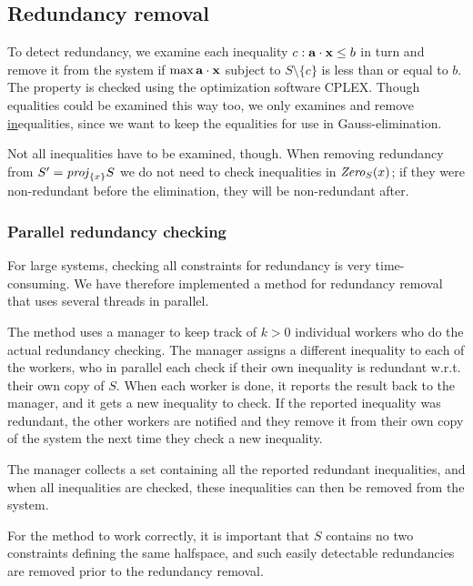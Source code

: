 \subsection{Redundancy removal}
To detect redundancy, we examine each inequality $c: \mathbf{a}\cdot \mathbf{x}\leq b$ in turn and remove it from the system if $\max \mathbf{a}\cdot \mathbf{x}$ subject to $S\setminus\{c\}$ is less than or equal to $b$. The property is checked using the optimization software CPLEX. Though equalities could be examined this way too, we only examines and remove \underline{in}equalities, since we want to keep the equalities for use in Gauss-elimination.

Not all inequalities have to be examined, though. When removing redundancy from $S' = \mathit{proj}_{\{x\}}S$ we do not need to check inequalities in $\mathit{Zero}_S(x)$; if they were non-redundant before the elimination, they will be non-redundant after.

\subsubsection{Parallel redundancy checking}
For large systems, checking all constraints for redundancy is very time-consuming. We have therefore implemented a method for redundancy removal that uses several threads in parallel. 

The method uses a manager to keep track of $k>0$ individual workers who do the actual redundancy checking.
The manager assigns a different inequality to each of the workers, who in parallel each check if their own inequality is redundant w.r.t. their own copy of $S$. When each worker is done, it reports the result back to the manager, and it gets a new inequality to check.  
If the reported inequality was redundant, the other workers are notified and they remove it from their own copy of the system the next time they check a new inequality. 

The manager collects a set containing all the reported redundant inequalities, and when all inequalities are checked, these inequalities can then be removed from the system.

For the method to work correctly, it is important that $S$ contains no two constraints defining the same halfspace, and such easily detectable redundancies are removed prior to the redundancy removal.

